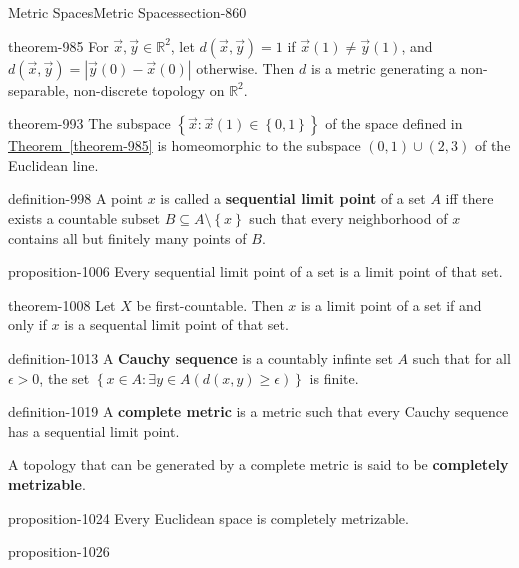 \documentclass[oneside,10pt,]{article}
\newcommand{\terminology}[1]{\textbf{#1}}
\newcommand{\mb}{\mathbb}
\newcommand{\setBuilder}[2]{\left\{#1:#2\right\}}
\newcommand{\setList}[1]{\left\{#1\right\}}
\newcommand{\gt}{>}
\begin{document}
\begin{sectionptx}{Metric Spaces}{}{Metric Spaces}{}{}{section-860}
\begin{theorem}{}{}{theorem-985}
For \(\vec x,\vec y\in\mb R^2\), let \(d(\vec x,\vec y)=1\) if \(\vec x(1)\not=\vec y(1)\), and \(d(\vec x,\vec y)=|\vec y(0)-\vec x(0)|\) otherwise. Then \(d\) is a metric generating a non-separable, non-discrete topology on \(\mb R^2\).%
\end{theorem}
\begin{theorem}{}{}{theorem-993}%
\hypertarget{p-994}{}%
The subspace \(\setBuilder{\vec x}{\vec{x}(1)\in\setList{0,1}}\) of the space defined in \hyperref[theorem-985]{Theorem~\ref{theorem-985}} is homeomorphic to the subspace \((0,1)\cup(2,3)\) of the Euclidean line.%
\end{theorem}
\begin{definition}{}{definition-998}%
\hypertarget{p-999}{}%
A point \(x\) is called a \terminology{sequential limit point} of a set \(A\) iff there exists a countable subset \(B\subseteq A\setminus\setList{x}\) such that every neighborhood of \(x\) contains all but finitely many points of \(B\).%
\end{definition}
\begin{proposition}{}{}{proposition-1006}%
\hypertarget{p-1007}{}%
Every sequential limit point of a set is a limit point of that set.%
\end{proposition}
\begin{theorem}{}{}{theorem-1008}%
\hypertarget{p-1009}{}%
Let \(X\) be first-countable. Then \(x\) is a limit point of a set if and only if \(x\) is a sequental limit point of that set.%
\end{theorem}
\begin{definition}{}{definition-1013}%
\hypertarget{p-1014}{}%
A \terminology{Cauchy sequence} is a countably infinte set \(A\) such that for all \(\epsilon\gt0\), the set \(\setBuilder{x\in A}{\exists y\in A(d(x,y)\geq\epsilon)}\) is finite.%
\end{definition}
\begin{definition}{}{definition-1019}%
\hypertarget{p-1020}{}%
A \terminology{complete metric} is a metric such that every Cauchy sequence has a sequential limit point.%
\par
\hypertarget{p-1022}{}%
A topology that can be generated by a complete metric is said to be \terminology{completely metrizable}.%
\end{definition}
\begin{proposition}{}{}{proposition-1024}%
\hypertarget{p-1025}{}%
Every Euclidean space is completely metrizable.%
\end{proposition}
\begin{proposition}{}{}{proposition-1026}%

\end{proposition}
\end{sectionptx}
\end{document}
